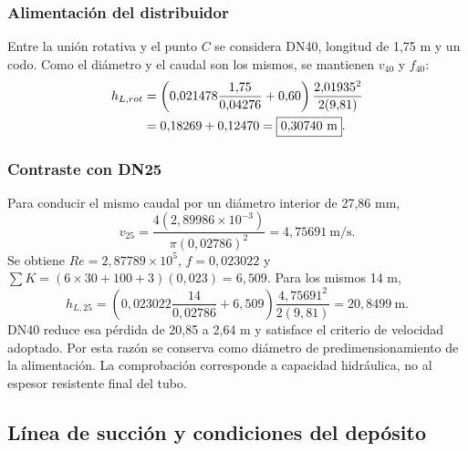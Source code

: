 \subsubsection{Alimentación del distribuidor}
Entre la unión rotativa y el punto $C$ se considera DN40, longitud de
1,75 m y un codo. Como el diámetro y el caudal son los mismos, se
mantienen $v_{40}$ y $f_{40}$:
\begin{align}
 h_{L,rot}&=\left(0{,}021478\frac{1{,}75}{0{,}04276}+0{,}60\right)
 \frac{2{,}01935^2}{2(9{,}81)}\notag\\
 &=0{,}18269+0{,}12470=\boxed{0{,}30740\ \mathrm{m}}.
 \label{eq:man-asp-hrot}
\end{align}

\subsubsection{Contraste con DN25}
Para conducir el mismo caudal por un diámetro interior de 27,86 mm,
\begin{equation}
 v_{25}=\frac{4(2{,}89986\times10^{-3})}{\pi(0{,}02786)^2}
 =4{,}75691\ \mathrm{m/s}.
\end{equation}
Se obtiene $Re=2{,}87789\times10^5$, $f=0{,}023022$ y
$\sum K=(6\times30+100+3)(0{,}023)=6{,}509$. Para los mismos 14 m,
\begin{equation}
 h_{L,25}=\left(0{,}023022\frac{14}{0{,}02786}+6{,}509\right)
 \frac{4{,}75691^2}{2(9{,}81)}=20{,}8499\ \mathrm{m}.
\end{equation}
DN40 reduce esa pérdida de 20,85 a 2,64 m y satisface el criterio de
velocidad adoptado. Por esta razón se conserva como diámetro de
predimensionamiento de la alimentación. La comprobación corresponde
a capacidad hidráulica, no al espesor resistente final del tubo.

\subsection{Línea de succión y condiciones del depósito}
\label{sec:man-asp-succion}

